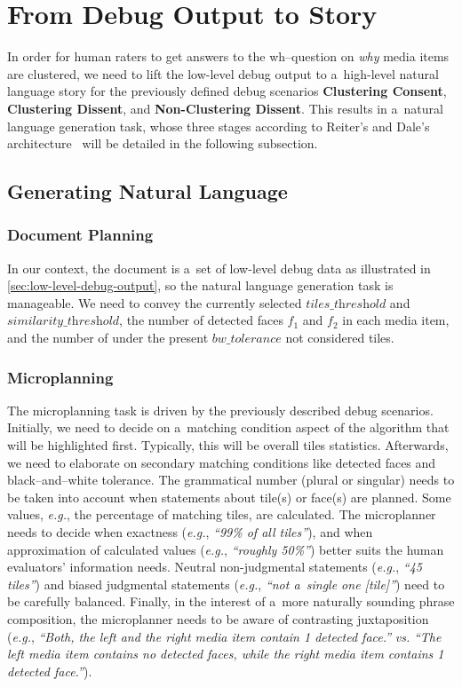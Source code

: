 \documentclass{article}
\begin{document}
\section{From Debug Output to Story}
\label{sec:from-debug-output-to-story}

In order for human raters to get answers to the wh--question
on \emph{why} media items are clustered,
we need to lift the low-level debug output
to a~high-level natural language story
for the previously defined debug scenarios
\textbf{Clustering Consent}, \textbf{Clustering Dissent},
and \textbf{Non-Clustering Dissent}.
This results in a~natural language generation task,
whose three stages according to Reiter's and Dale's architecture~%
\cite{reiter2000building} will be detailed in the following subsection.

\subsection{Generating Natural Language}

\subsubsection{Document Planning}

In our context, the document is a~set of low-level debug data 
as illustrated in \autoref{sec:low-level-debug-output},
so the natural language generation task is manageable.
We need to convey the currently selected $\textit{tiles\_threshold}$
and $\textit{similarity\_threshold}$,
the number of detected faces $f_1$ and $f_2$ in each media item,
and the number of under the present $\textit{bw\_tolerance}$
not considered tiles.

\subsubsection{Microplanning}

The microplanning task is driven by the previously described debug scenarios.
Initially, we need to decide on a~matching condition aspect of the algorithm
that will be highlighted first.
Typically, this will be overall tiles statistics.
Afterwards, we need to elaborate on secondary matching conditions
like detected faces and black--and--white tolerance.
The grammatical number (plural or singular) needs to be taken into account
when statements about tile(s) or face(s) are planned.
Some values, \emph{e.g.}, the percentage of matching tiles, are calculated.
The microplanner needs to decide when exactness
(\emph{e.g.}, \textit{``99\% of all tiles''}),
and when approximation of calculated values
(\emph{e.g.}, \textit{``roughly 50\%''})
better suits the human evaluators' information needs. 
Neutral non-judgmental statements
(\emph{e.g.}, \textit{``45 tiles''})
and biased judgmental statements
(\emph{e.g.}, \textit{``not a~single one [tile]''})
need to be carefully balanced. 
Finally, in the interest of a~more naturally sounding phrase composition,
the microplanner needs to be aware of contrasting juxtaposition
(\emph{e.g.}, \textit{``Both, the left and the right media item contain 1 detected face.''} \emph{vs.}
\textit{``The left media item contains no detected faces, while the right media item contains 1 detected face.''}).
\end{document}
